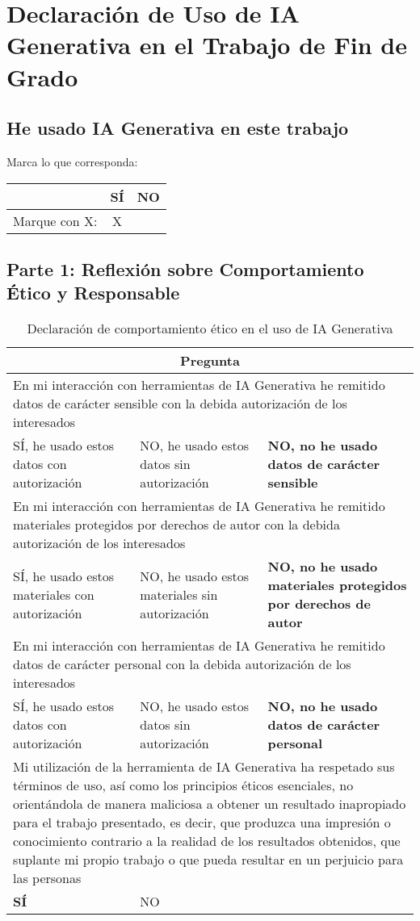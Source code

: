 \chapter{Declaración de Uso de IA Generativa en el Trabajo de Fin de Grado}
\label{chap:IA}
\section*{He usado IA Generativa en este trabajo}
Marca lo que corresponda:
\begin{tabular}{|p{3cm}|c|c|}
\hline
& SÍ & NO \\
\hline
Marque con X: & \multicolumn{1}{|c|}{X} & \multicolumn{1}{|c|}{} \\
\hline
\end{tabular}

\section*{Parte 1: Reflexión sobre Comportamiento Ético y Responsable}

\begin{table}[H]
\centering
\begin{tabular}{|p{4cm}|p{4cm}|p{4cm}|}
\hline
\multicolumn{3}{|c|}{\textbf{Pregunta}} \\ \hline
\multicolumn{3}{|p{12cm}|}{En mi interacción con herramientas de IA Generativa he remitido datos de carácter sensible con la debida autorización de los interesados} \\ \hline
SÍ, he usado estos datos con autorización & NO, he usado estos datos sin autorización & \textbf{NO, no he usado datos de carácter sensible} \\ \hline
\multicolumn{3}{|p{12cm}|}{En mi interacción con herramientas de IA Generativa he remitido materiales protegidos por derechos de autor con la debida autorización de los interesados} \\ \hline
SÍ, he usado estos materiales con autorización & NO, he usado estos materiales sin autorización & \textbf{NO, no he usado materiales protegidos por derechos de autor} \\ \hline
\multicolumn{3}{|p{12cm}|}{En mi interacción con herramientas de IA Generativa he remitido datos de carácter personal con la debida autorización de los interesados} \\ \hline
SÍ, he usado estos datos con autorización & NO, he usado estos datos sin autorización & \textbf{NO, no he usado datos de carácter personal} \\ \hline
\multicolumn{3}{|p{12cm}|}{Mi utilización de la herramienta de IA Generativa ha respetado sus términos de uso, así como los principios éticos esenciales, no orientándola de manera maliciosa a obtener un resultado inapropiado para el trabajo presentado, es decir, que produzca una impresión o conocimiento contrario a la realidad de los resultados obtenidos, que suplante mi propio trabajo o que pueda resultar en un perjuicio para las personas} \\ \hline
\textbf{SÍ} & NO & \\ \hline
\end{tabular}
\caption{Declaración de comportamiento ético en el uso de IA Generativa}
\end{table}

